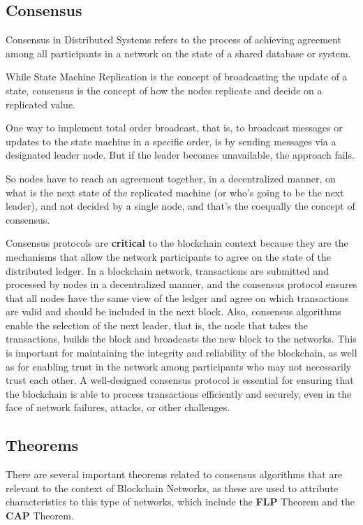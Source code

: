 \subsection*{\textbf{Consensus}}
Consensus in Distributed Systems refers to the process of achieving agreement among all participants in a network on the state of a shared database or system.

While State Machine Replication is the concept of broadcasting the update of a state, consensus is the concept of how the nodes replicate and decide on a replicated value.

One way to implement total order broadcast, that is, to broadcast messages or updates to the state machine in a specific order, is by sending messages via a designated leader node. But if the leader becomes unavailable, the approach fails. 

So nodes have to reach an agreement together, in a decentralized manner, on what is the next state of the replicated machine (or who's going to be the next leader), and not decided by a single node, and that's the coequally the concept of consensus.

Consensus protocols are \textbf{critical} to the blockchain context because they are the mechanisms that allow the network participants to agree on the state of the distributed ledger. In a blockchain network, transactions are submitted and processed by nodes in a decentralized manner, and the consensus protocol ensures that all nodes have the same view of the ledger and agree on which transactions are valid and should be included in the next block. Also, consensus algorithms enable the selection of the next leader, that is, the node that takes the transactions, builds the block and broadcasts the new block to the networks. 
This is important for maintaining the integrity and reliability of the blockchain, as well as for enabling trust in the network among participants who may not necessarily trust each other. A well-designed consensus protocol is essential for ensuring that the blockchain is able to process transactions efficiently and securely, even in the face of network failures, attacks, or other challenges.




\subsection*{Theorems}
There are several important theorems related to consensus algorithms that are relevant to the context of Blockchain Networks, as these are used to attribute characteristics to this type of networks, which include the \textbf{FLP} Theorem and the \textbf{CAP} Theorem.

